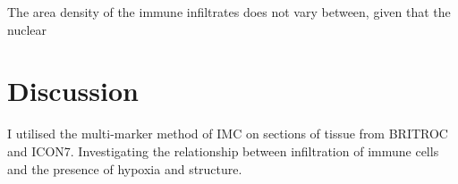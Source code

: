 The area density of the immune infiltrates does not vary between, given that the nuclear 




\section{Discussion}
I utilised the multi-marker method of IMC on sections of tissue from BRITROC and ICON7. Investigating the relationship between infiltration of immune cells and the presence of hypoxia and structure.
